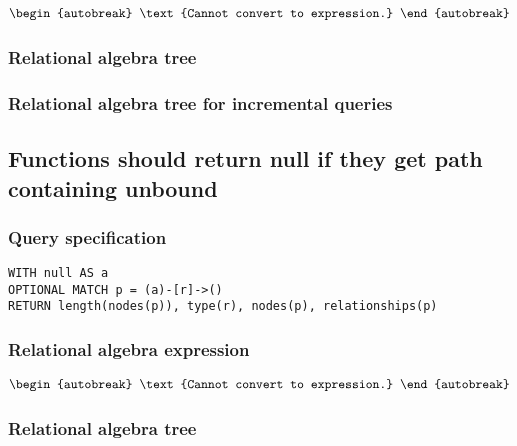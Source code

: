 \begin{align*}
\begin{autobreak}
\text{Cannot convert to expression.}
\end{autobreak}
\end{align*}

\subsubsection*{Relational algebra tree}


\subsubsection*{Relational algebra tree for incremental queries}


\subsection{Functions should return null if they get path containing unbound}

\subsubsection*{Query specification}

\begin{lstlisting}
WITH null AS a
OPTIONAL MATCH p = (a)-[r]->()
RETURN length(nodes(p)), type(r), nodes(p), relationships(p)
\end{lstlisting}

\subsubsection*{Relational algebra expression}

\begin{align*}
\begin{autobreak}
\text{Cannot convert to expression.}
\end{autobreak}
\end{align*}

\subsubsection*{Relational algebra tree}

